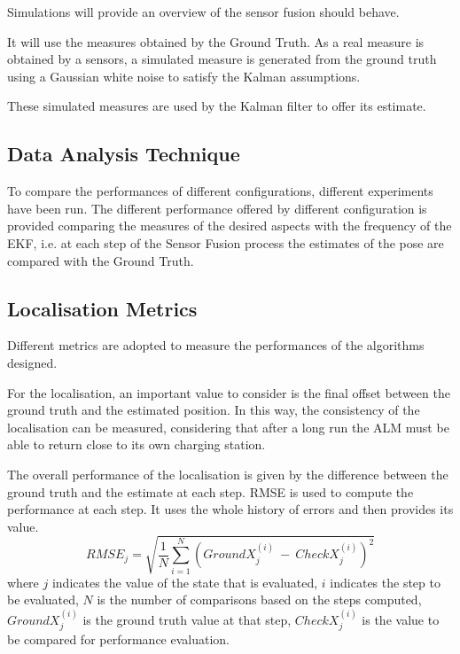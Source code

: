 \noindent Simulations will provide an overview of the sensor fusion should behave.

It will use the measures obtained by the Ground Truth.
As a real measure is obtained by a sensors, a simulated measure is generated from the ground truth using a Gaussian white noise to satisfy the Kalman assumptions.

These simulated measures are used by the Kalman filter to offer its estimate.



\subsection{Data Analysis Technique} 

\noindent To compare the performances of different configurations, different experiments have been run.
The different performance offered by different configuration is provided comparing the measures of the desired aspects with the frequency of the \gls{EKF}, i.e. at each step of the Sensor Fusion process the estimates of the pose are compared with the Ground Truth.



\subsection{Localisation Metrics}

\noindent Different metrics are adopted to measure the performances of the algorithms designed.

For the localisation, an important value to consider is the final offset between the ground truth and the estimated position.
In this way, the consistency of the localisation can be measured, considering that after a long run the \gls{ALM} must be able to return close to its own charging station.

The overall performance of the localisation is given by the difference between the ground truth and the estimate at each step.
\gls{RMSE} is used to compute the performance at each step.
It uses the whole history of errors and then provides its value.
\begin{equation}
    RMSE_j = \sqrt{ \frac{1}{N}\sum_{i=1}^{N} (GroundX_j^{(i)}~-~CheckX_j^{(i)})^2}
\end{equation}
where $j$ indicates the value of the state that is evaluated, $i$ indicates the step to be evaluated, $N$ is the number of comparisons based on the steps computed, $GroundX_j^{(i)}$ is the ground truth value at that step, $CheckX_j^{(i)}$ is the value to be compared for performance evaluation.

